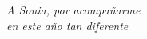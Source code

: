 
\thispagestyle{empty}

\hfill
\vfill

\begin{flushright}
\itshape
A Sonia, por acompañarme\\
en este año tan diferente
\end{flushright}

\vfill
\vfill

\cleardoublepage
\endinput
